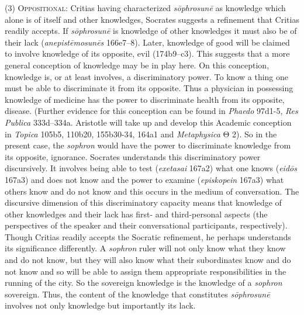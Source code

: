 (3) \textsc{Oppositional}: Critias having characterized \emph{sōphrosunē} as knowledge which alone is of itself and other knowledges, Socrates suggests a refinement that Critias readily accepts. If \emph{sōphrosunē} is knowledge of other knowledges it must also be of their lack (\emph{anepistēmosunēs} 166e7–8). Later, knowledge of good will be claimed to involve knowledge of its opposite, evil (174b9–c3). This suggests that a more general conception of knowledge may be in play here. On this conception, knowledge is, or at least involves, a discriminatory power. To know a thing one must be able to discriminate it from its opposite.  Thus a physician in possessing knowledge of medicine has the power to discriminate health from its opposite, disease. (Further evidence for this conception can be found in \emph{Phaedo} 97d1-5, \emph{Res Publica} 333d–334a. Aristotle will take up and develop this Academic conception in \emph{Topica} 105b5, 110b20, 155b30-34, 164a1 and \emph{Metaphysica} {\sbl Θ} 2). So in the present case, the \emph{sophron} would have the power to discriminate knowledge from its opposite, ignorance. Socrates understands this discriminatory power discursively. It involves being able to test (\emph{exetasai} 167a2) what one knows (\emph{eidōs} 167a3) and does not know and the power to examine (\emph{episkopein} 167a3) what others know and do not know and this occurs in the medium of conversation. The discursive dimension of this discriminatory capacity means that knowledge of other knowledges and their lack has first- and third-personal aspects (the perspectives of the speaker and their conversational participants, respectively). Though Critias readily accepts the Socratic refinement, he perhaps understands its significance differently. A \emph{sophron} ruler will not only know what they know and do not know, but they will also know what their subordinates know and do not know and so will be able to assign them appropriate responsibilities in the running of the city. So the sovereign knowledge is the knowledge of a \emph{sophron} sovereign. Thus, the content of the knowledge that constitutes \emph{sōphrosunē} involves not only knowledge but importantly its lack. 

